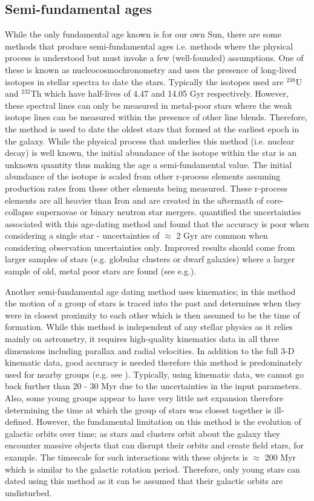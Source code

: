 \subsection{Semi-fundamental ages}
While the only fundamental age known is for our own Sun, there are some methods that produce semi-fundamental ages i.e. methods where the physical process is understood but must invoke a few (well-founded) assumptions. One of these is known as nucleocosmochronometry and uses the presence of long-lived isotopes in stellar spectra to date the stars. Typically the isotopes used are $^{238}$U and $^{232}$Th which have half-lives of 4.47 and 14.05 Gyr respectively. However, these spectral lines can only be measured in metal-poor stars where the weak isotope lines can be measured within the presence of other line blends. Therefore, the method is used to date the oldest stars that formed at the earliest epoch in the galaxy. While the physical process that underlies this method (i.e. nuclear decay) is well known, the initial abundance of the isotope within the star is an unknown quantity thus making the age a semi-fundamental value. The initial abundance of the isotope is scaled from other r-process elements assuming production rates from these other elements being measured. These r-process elements are all heavier than Iron and are created in the aftermath of core-collapse supernovae or binary neutron star mergers. \citet{Ludwig_etal_2010} quantified the uncertainties associated with this age-dating method and found that the accuracy is poor when considering a single star - uncertainties of $\approx$ 2 Gyr are common when considering observation uncertainties only. Improved results should come from larger samples of stars (e.g. globular clusters or dwarf galaxies) where a larger sample of old, metal poor stars are found (see e.g.\citealt{Hansen_etal_2018}). 

Another semi-fundamental age dating method uses kinematics; in this method the motion of a group of stars is traced into the past and determines when they were in closest proximity to each other which is then assumed to be the time of formation. While this method is independent of any stellar physics as it relies mainly on astrometry, it requires high-quality kinematics data in all three dimensions including parallax and radial velocities. In addition to the full 3-D kinematic data, good accuracy is needed therefore this method is predominately used for nearby groups (e.g. see \citealt{Makarov_2007}). Typically, using kinematic data, we cannot go back further than 20 - 30 Myr due to the uncertainties in the input parameters. Also, some young groups appear to have very little net expansion \citep{Mamajek_2005} therefore determining the time at which the group of stars was closest together is ill-defined. However, the fundamental limitation on this method is the evolution of galactic orbits over time; as stars and clusters orbit about the galaxy they encounter massive objects that can disrupt their orbits and create field stars, for example. The timescale for such interactions with these objects is $\approx$ 200 Myr \citep{Janes_Phelps_1994} which is similar to the galactic rotation period. Therefore, only young stars can dated using this method as it can be assumed that their galactic orbits are undisturbed.

